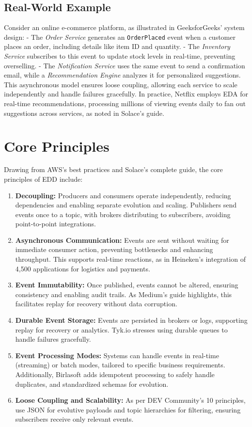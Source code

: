 \documentclass[12pt,a4paper]{report}
\begin{document}
\subsection{Real-World Example}
Consider an online e-commerce platform, as illustrated in GeeksforGeeks' system design:  
- The \textit{Order Service} generates an \texttt{OrderPlaced} event when a customer places an order, including details like item ID and quantity.  
- The \textit{Inventory Service} subscribes to this event to update stock levels in real-time, preventing overselling.  
- The \textit{Notification Service} uses the same event to send a confirmation email, while a \textit{Recommendation Engine} analyzes it for personalized suggestions.  
This asynchronous model ensures loose coupling, allowing each service to scale independently and handle failures gracefully. In practice, Netflix employs EDA for real-time recommendations, processing millions of viewing events daily to fan out suggestions across services, as noted in Solace's guide.

\section{Core Principles}
Drawing from AWS's best practices and Solace's complete guide, the core principles of EDD include:
\begin{enumerate}[label=\arabic*.]
    \item \textbf{Decoupling:} Producers and consumers operate independently, reducing dependencies and enabling separate evolution and scaling. Publishers send events once to a topic, with brokers distributing to subscribers, avoiding point-to-point integrations.
    \item \textbf{Asynchronous Communication:} Events are sent without waiting for immediate consumer action, preventing bottlenecks and enhancing throughput. This supports real-time reactions, as in Heineken's integration of 4,500 applications for logistics and payments.
    \item \textbf{Event Immutability:} Once published, events cannot be altered, ensuring consistency and enabling audit trails. As Medium's guide highlights, this facilitates replay for recovery without data corruption.
    \item \textbf{Durable Event Storage:} Events are persisted in brokers or logs, supporting replay for recovery or analytics. Tyk.io stresses using durable queues to handle failures gracefully.
    \item \textbf{Event Processing Modes:} Systems can handle events in real-time (streaming) or batch modes, tailored to specific business requirements. Additionally, Birlasoft adds idempotent processing to safely handle duplicates, and standardized schemas for evolution.
    \item \textbf{Loose Coupling and Scalability:} As per DEV Community's 10 principles, use JSON for evolutive payloads and topic hierarchies for filtering, ensuring subscribers receive only relevant events.
\end{enumerate}
\end{document}
